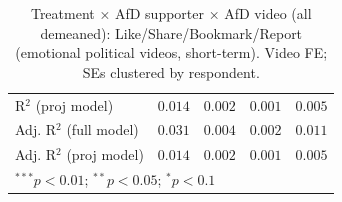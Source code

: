 \begin{table}
\begin{center}
\begin{tabular}{l c c c c}
R$^2$ (proj model)                               & $0.014$       & $0.002$       & $0.001$       & $0.005$        \\
Adj. R$^2$ (full model)                          & $0.031$       & $0.004$       & $0.002$       & $0.011$        \\
Adj. R$^2$ (proj model)                          & $0.014$       & $0.002$       & $0.001$       & $0.005$        \\
\hline
\multicolumn{5}{l}{\scriptsize{$^{***}p<0.01$; $^{**}p<0.05$; $^{*}p<0.1$}}
\end{tabular}
\caption{Treatment × AfD supporter × AfD video (all demeaned): Like/Share/Bookmark/Report (emotional political videos, short-term). Video FE; SEs clustered by respondent.}
\label{tab:afd_video_3way_demeaned}
\end{center}
\end{table}
